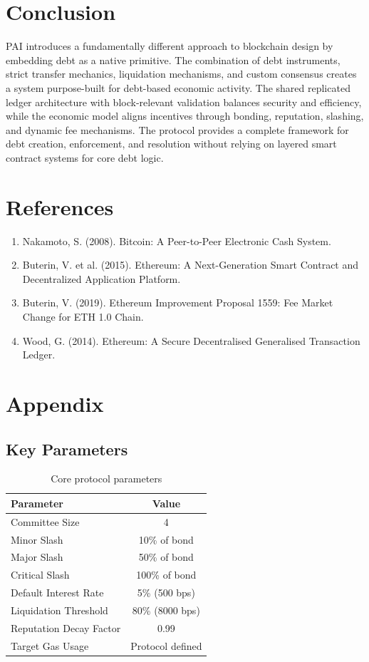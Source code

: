 \documentclass[11pt,a4paper]{article}
\begin{document}
\section{Conclusion}
PAI introduces a fundamentally different approach to blockchain design by embedding debt as a native primitive. The combination of debt instruments, strict transfer mechanics, liquidation mechanisms, and custom consensus creates a system purpose-built for debt-based economic activity. The shared replicated ledger architecture with block-relevant validation balances security and efficiency, while the economic model aligns incentives through bonding, reputation, slashing, and dynamic fee mechanisms. The protocol provides a complete framework for debt creation, enforcement, and resolution without relying on layered smart contract systems for core debt logic.

\section{References}
\begin{enumerate}
\item Nakamoto, S. (2008). Bitcoin: A Peer-to-Peer Electronic Cash System.
\item Buterin, V. et al. (2015). Ethereum: A Next-Generation Smart Contract and Decentralized Application Platform.
\item Buterin, V. (2019). Ethereum Improvement Proposal 1559: Fee Market Change for ETH 1.0 Chain.
\item Wood, G. (2014). Ethereum: A Secure Decentralised Generalised Transaction Ledger.
\end{enumerate}

\section{Appendix}
\subsection{Key Parameters}
\begin{table}[H]
\centering
\begin{tabular}{lc}
\toprule
\textbf{Parameter} & \textbf{Value} \\
\midrule
Committee Size & 4 \\
Minor Slash & 10\% of bond \\
Major Slash & 50\% of bond \\
Critical Slash & 100\% of bond \\
Default Interest Rate & 5\% (500 bps) \\
Liquidation Threshold & 80\% (8000 bps) \\
Reputation Decay Factor & 0.99 \\
Target Gas Usage & Protocol defined \\
\bottomrule
\end{tabular}
\caption{Core protocol parameters}
\label{tab:params}
\end{table}
\end{document}
